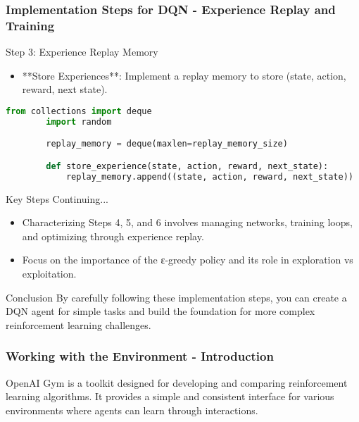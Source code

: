 \documentclass{beamer}
\begin{document}
\begin{frame}[fragile]
    \frametitle{Implementation Steps for DQN - Experience Replay and Training}
    \begin{block}{Step 3: Experience Replay Memory}
        \begin{itemize}
            \item **Store Experiences**: Implement a replay memory to store (state, action, reward, next state).
        \end{itemize}
        \begin{lstlisting}[language=Python]
        from collections import deque
        import random

        replay_memory = deque(maxlen=replay_memory_size)

        def store_experience(state, action, reward, next_state):
            replay_memory.append((state, action, reward, next_state))
        \end{lstlisting}
    \end{block}

    \begin{block}{Key Steps Continuing...}
        \begin{itemize}
            \item Characterizing Steps 4, 5, and 6 involves managing networks, training loops, and optimizing through experience replay.
            \item Focus on the importance of the ε-greedy policy and its role in exploration vs exploitation.
        \end{itemize}
    \end{block}
    
    \begin{block}{Conclusion}
        By carefully following these implementation steps, you can create a DQN agent for simple tasks and build the foundation for more complex reinforcement learning challenges.
    \end{block}
\end{frame}

\begin{frame}[fragile]
    \frametitle{Working with the Environment - Introduction}
    OpenAI Gym is a toolkit designed for developing and comparing reinforcement learning algorithms. It provides a simple and consistent interface for various environments where agents can learn through interactions.
\end{frame}
\end{document}
